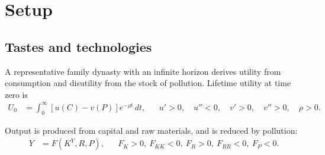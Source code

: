 ﻿\section{Setup}\label{sec:sp:setup}

\subsection{Tastes and technologies}
\label{sec:sp:setup:primitives}


 A representative family dynasty with an infinite horizon derives utility from consumption and disutility from the stock of pollution. Lifetime utility at time zero is
\begin{align}
U_0 &= \int_0^{\infty}\left[u(C)-v(P)\right]e^{-\rho t}\,dt,
&&
u'>0,\quad u''<0,\quad v'>0,\quad v''>0,\quad \rho>0.
\label{eq:sp:setup:utility}
\end{align}

 Output is produced from capital and raw materials, and is reduced by pollution:
\begin{align}
Y &= F\left(K^Y,R,P\right),
&&
F_K>0,\ F_{KK}<0,\ F_R>0,\ F_{RR}<0,\ F_P<0.
\label{eq:sp:setup:output}
\end{align}

